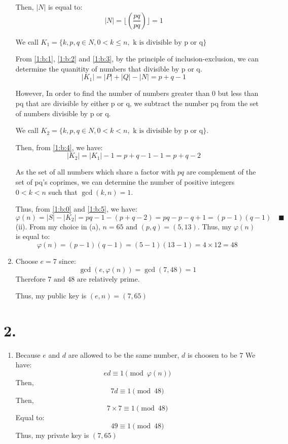 \documentclass{article}
\begin{document}
\begin{enumerate}[label=({\alph*})]
		Then, \(\left| N \right|\) is equal to:
		\begin{equation}
			\left| N \right| = \lfloor (\frac{pq}{pq})  \rfloor = 1\quad \label{1:b:3}
		\end{equation}

		We call \(K_{1} = \{k, p, q \in N, 0 < k \leq n, \text{ k is divisible by p or q}\}\)

		From \eqref{1:b:1}, \eqref{1:b:2} and \eqref{1:b:3}, by the principle of inclusion-exclusion, we can determine the quanitity of numbers that divisible by p or q.
		\begin{equation}
		\left| K_{1} \right| = \left| P \right| + \left| Q \right| - \left| N \right| = p + q - 1 \quad \label{1:b:4}
		\end{equation}

		However, In order to find the number of numbers greater than \(0\)
		but less than pq that are divisible by either \(\text{p or q}\), we subtract the number pq from the set of numbers divisible by \(\text{p or q}\).

		We call \(K_{2} = \{k, p, q \in N, 0 < k < n, \text{ k is divisible by p or q}\}\).

		Then, from \eqref{1:b:4}, we have:
		\begin{equation}
			\left| K_{2} \right| = \left| K_{1} \right| - 1 = p + q - 1 - 1 = p + q - 2 \quad \label{1:b:5}
		\end{equation}

		As the set of all numbers which share a factor with \(pq\) are complement of the set of pq's coprimes, we can determine the number of positive integers \(0 < k < n\) such that \(\gcd{(k, n)} = 1\).

		Thus, from \eqref{1:b:0} and \eqref{1:b:5}, we have:
		\[\varphi(n) = \left| S \right| -  \left| K_{2} \right| = pq - 1 - (p + q - 2) = pq - p - q + 1 = (p - 1)(q - 1) \quad \blacksquare\]
		(ii). From my choice in (a), \(n = 65 \text{ and } (p, q) = (5, 13)\). Thus, my \(\varphi(n)\) is equal to:
		\[\varphi(n) = (p - 1)(q - 1) = (5 - 1)(13 - 1) = 4 \times 12 = 48\]
		\item Choose \(e = 7\) since:
		\[\gcd{(e, \varphi(n))} = \gcd{(7, 48)} = 1\]
		Therefore \(7 \text{ and } 48 \text{ are relatively prime}\).

		Thus, my public key is \((e, n) = (7, 65)\)
		\pagebreak
	\end{enumerate}
	\section*{2. }
	\begin{enumerate}[label=({\alph*})]
		\item Because \(e\) and \(d\) are allowed to be the same number, \(d\) is choosen to be \(7\)
		We have:
		\[ed \equiv 1 \pmod{\varphi(n)} \]
		Then,
		\[7d \equiv 1 \pmod{48}\]
		Then,
		\[7 \times 7 \equiv 1 \pmod{48}\]
		Equal to:
		\[49 \equiv 1 \pmod{48}\]
		Thus, my private key is \((7, 65)\)
	\end{enumerate}
\end{document}
